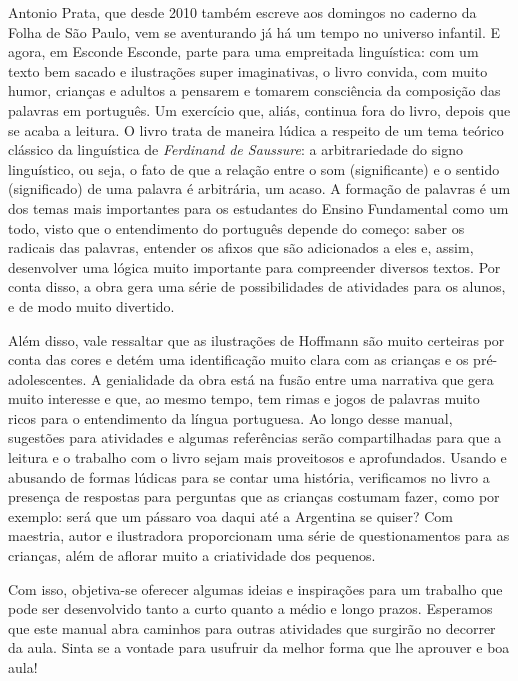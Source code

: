 \documentclass[11pt]{extarticle}
\begin{document}
Antonio Prata, que desde 2010 também escreve aos domingos no caderno da Folha de São Paulo, vem se aventurando já há um tempo no universo infantil. E agora, em Esconde Esconde, parte para uma empreitada linguística: com um texto bem sacado e ilustrações super imaginativas, o livro convida, com muito humor, crianças e adultos a pensarem e tomarem consciência da composição das palavras em português. Um exercício que, aliás, continua fora do livro, depois que se acaba a leitura. O livro trata de maneira lúdica a respeito de um tema teórico clássico da linguística de \textit{Ferdinand de Saussure}: a arbitrariedade do signo linguístico, ou seja, o fato de que a relação entre o som (significante) e o sentido (significado) de uma palavra é arbitrária, um acaso. A formação de palavras é um dos temas mais importantes para os estudantes do Ensino Fundamental como um todo, visto que o entendimento do português depende do começo: saber os radicais das palavras, entender os afixos que são adicionados a eles e, assim, desenvolver uma lógica muito importante para compreender diversos textos. Por conta disso, a obra gera uma série de possibilidades de atividades para os alunos, e de modo muito divertido. 

Além disso, vale ressaltar que as ilustrações de Hoffmann são muito certeiras por conta das cores e detém uma identificação muito clara com as crianças e os pré-adolescentes. A genialidade da obra está na fusão entre uma narrativa que gera muito interesse e que, ao mesmo tempo, tem rimas e jogos de palavras muito ricos para o entendimento da língua portuguesa. Ao longo desse manual, sugestões para atividades e algumas referências serão compartilhadas para que a leitura e o trabalho com o livro sejam mais proveitosos e aprofundados. Usando e abusando de formas lúdicas para se contar uma história, verificamos no livro a presença de respostas para perguntas que as crianças costumam fazer, como por exemplo: será que um pássaro voa daqui até a Argentina se quiser? Com maestria, autor e ilustradora proporcionam uma série de questionamentos para as crianças, além de aflorar muito a criatividade dos pequenos. 

Com isso, objetiva-se oferecer algumas ideias e inspirações para um trabalho que pode ser desenvolvido tanto a curto quanto a médio e longo prazos. Esperamos que este manual abra caminhos para outras atividades que surgirão no decorrer da aula. Sinta se a vontade para usufruir da melhor forma que lhe aprouver e boa aula!
\end{document}
